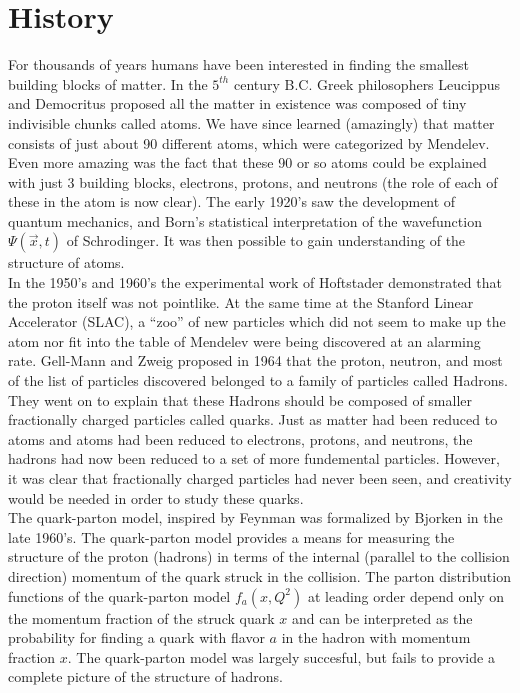 
\section{History}

For thousands of years humans have been interested in finding the smallest building blocks of matter.  In the $5^{th}$ century B.C. Greek philosophers Leucippus and Democritus proposed all the matter in existence was composed of tiny indivisible chunks called atoms.  We have since learned (amazingly) that matter consists of just about 90 different atoms, which were categorized by Mendelev.  Even more amazing was the fact that these 90 or so atoms could be explained with just 3 building blocks, electrons, protons, and neutrons (the role of each of these in the atom is now clear).  The early 1920's saw the development of quantum mechanics, and Born's statistical interpretation of the wavefunction $\Psi(\vec{x},t)$ of Schrodinger.  It was then possible to gain understanding of the structure of atoms. \\

In the 1950's and 1960's the experimental work of Hoftstader demonstrated that the proton itself was not pointlike.  At the same time at the Stanford Linear Accelerator (SLAC), a ``zoo'' of new particles which did not seem to make up the atom nor fit into the table of Mendelev were being discovered at an alarming rate.  Gell-Mann and Zweig proposed in 1964 that the proton, neutron, and most of the list of particles discovered belonged to a family of particles called Hadrons.  They went on to explain that these Hadrons should be composed of smaller fractionally charged particles called quarks.  Just as matter had been reduced to atoms and atoms had been reduced to electrons, protons, and neutrons, the hadrons had now been reduced to a set of more fundemental particles.  However, it was clear that fractionally charged particles had never been seen, and creativity would be needed in order to study these quarks.  \\

The quark-parton model, inspired by Feynman was formalized by Bjorken in the late 1960's.  The quark-parton model provides a means for measuring the structure of the proton (hadrons) in terms of the internal (parallel to the collision direction)  momentum of the quark struck in the collision.  The parton distribution functions of the quark-parton model $f_{a}(x,Q^{2})$ at leading order depend only on the momentum fraction of the struck quark $x$ and can be interpreted as the probability for finding a quark with flavor $a$ in the hadron with momentum fraction $x$.  The quark-parton model was largely succesful, but fails to provide a complete picture of the structure of hadrons.  \\

